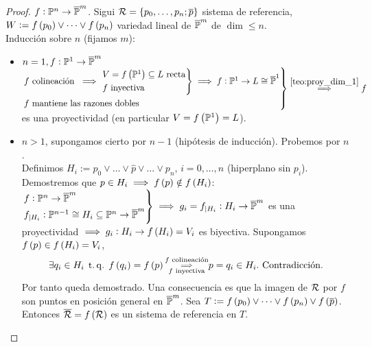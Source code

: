 \begin{proof}
    $f : \mathbb{P}^n \to \overline{\mathbb{P}}^m$. Sigui $\mathcal{R} = \{ p_0, \dots, p_n; \overline{p} \}$ sistema de referencia, $W := f \left( p_0 \right) \vee \dots \vee f \left( p_n \right)$ variedad lineal de $\overline{\mathbb{P}}^m$ de $\dim \leq n$. \\
    Inducción sobre $n$ (fijamos $m$):
    \begin{itemize}
        \item $n = 1, f : \mathbb{P}^1 \to \overline{\mathbb{P}}^m$ \\
        $\begin{rcases}
            f \text{ colineación } \implies 
            \begin{rcases}
                V = f \left( \mathbb{P}^1 \right) \subseteq L \text{ recta} \\
                f \text{ inyectiva}
            \end{rcases}
            \implies f : \mathbb{P}^1 \to L \cong \overline{\mathbb{P}}^1 \\
            f \text{ mantiene las razones dobles}
        \end{rcases}
        \stackrel{\ref{teo:proy_dim_1}}{\implies} f$ es una proyectividad (en particular $V = f \left( \mathbb{P}^1 \right) = L$).
        \item $n > 1$, supongamos cierto por $n-1$ (hipótesis de inducción). Probemos por $n$. \\
        Definimos $H_i := p_0 \vee \dots \vee \hat{p} \vee \dots \vee p_n$, $i = 0, \dots, n$ (hiperplano sin $p_i$). Demostremos que $p \in H_i \implies f \left( p \right) \notin f \left( H_i \right)$: \\
        $\begin{rcases}
            f : \mathbb{P}^n \to \overline{\mathbb{P}}^m \\
            f_{|H_i} : \mathbb{P}^{n-1} \cong H_i \subseteq \mathbb{P}^n \to \overline{\mathbb{P}}^m
        \end{rcases}
        \implies g_i = f_{|H_i} : H_i \to \overline{\mathbb{P}}^m$ es una proyectividad $\implies g_i : H_i \to f \left( H_i \right) = V_i$ es biyectiva. Supongamos $f \left( p \right) \in f \left( H_i \right) = V_i$,
        \[
            \exists q_i \in H_i \operatorname{\;t.q.\;} f \left( q_i \right) = f \left( p \right) \substack{f \text{ colineación} \\ \implies \\ f \text{ inyectiva}} p = q_i \in H_i. \text{ Contradicción.}
        \]
        Por tanto queda demostrado. Una consecuencia es que la imagen de $\mathcal{R}$ por $f$ son puntos en posición general en $\overline{\mathbb{P}}^m$. Sea $T := f \left( p_0 \right) \vee \dots \vee f \left( p_n \right) \vee f \left( \overline{p} \right)$. Entonces $\overline{\mathcal{R}} = f \left( \mathcal{R} \right)$ es un sistema de referencia en $T$.
        

\end{itemize}
\end{proof}
